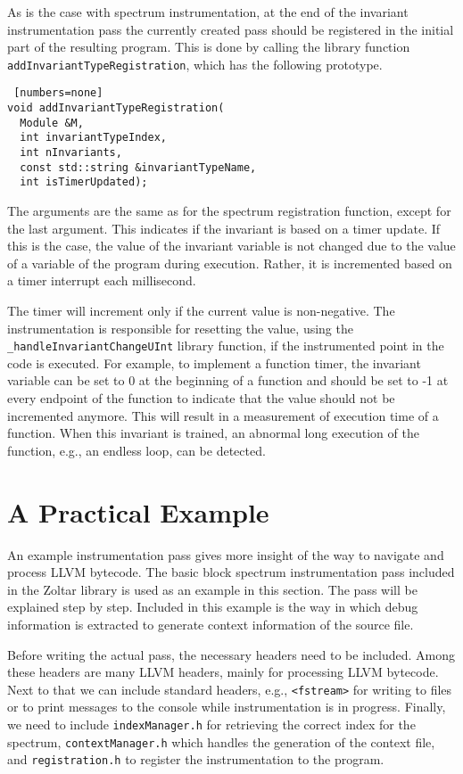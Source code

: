 As is the case with spectrum instrumentation,
at the end of the invariant instrumentation pass 
the currently created pass should be registered in the initial
part of the resulting program.
This is done by calling the library function \texttt{addInvariantTypeRegistration}, 
which has the following prototype.
\begin{lstlisting} [numbers=none]
void addInvariantTypeRegistration(
  Module &M,
  int invariantTypeIndex, 
  int nInvariants, 
  const std::string &invariantTypeName, 
  int isTimerUpdated);
\end{lstlisting}
The arguments are the same as for the spectrum registration function,
except for the last argument.
This indicates if the invariant is based on a timer update.
If this is the case, the value of the invariant variable 
is not changed due to the value of a variable of the program
during execution.
Rather, it is incremented based on a timer interrupt each millisecond.

The timer will increment only if the current value is non-negative.
The instrumentation is responsible for resetting the value,
using the \texttt{\_handleInvariantChangeUInt} library function, 
if the instrumented point in the code is executed.
For example, to implement a function timer, 
the invariant variable can be set to 0 at the beginning of a function
and should be set to -1 at every endpoint of the function
to indicate that the value should not be incremented anymore.
This will result in a measurement of execution time of a function.
When this invariant is trained, an abnormal long execution of the function,
e.g., an endless loop, can be detected.



\section{A Practical Example}

An example instrumentation pass gives more insight of the 
way to navigate and process LLVM bytecode.
The basic block spectrum instrumentation pass included in
the Zoltar library is used as an example in this section.
The pass will be explained step by step.
Included in this example is the way in which debug information
is extracted to generate context information of the source file.

Before writing the actual pass, the necessary headers need to
be included. 
Among these headers are many LLVM headers, mainly for processing LLVM
bytecode.
Next to that we can include standard headers, e.g., \texttt{<fstream>}
for writing to files or to print messages to the console while 
instrumentation is in progress.
Finally, we need to include \texttt{indexManager.h} for retrieving the
correct index for the spectrum, 
\texttt{contextManager.h} which handles the generation of the context file,
and \texttt{registration.h} to register the instrumentation to the program.

